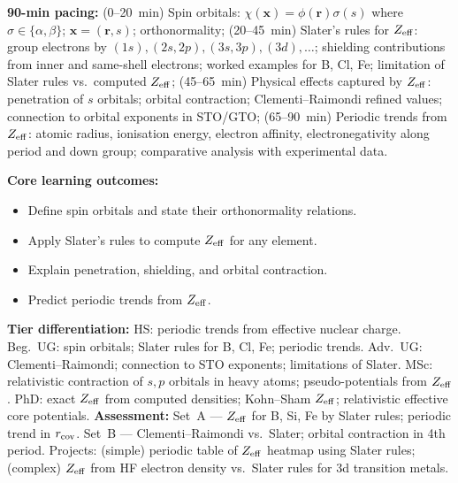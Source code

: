 \documentclass[11pt,a4paper]{article}
\begin{document}
\medskip

\begin{tcolorbox}[chembox, title={Module~III.2 / L04: Spin Orbitals, Slater Screening, and Effective Nuclear Charge}]
\textbf{90-min pacing:} (0--20~min) Spin orbitals: $\chi(\mathbf{x})=\phi(\mathbf{r})\sigma(s)$ where $\sigma\in\{\alpha,\beta\}$; $\mathbf{x}=(\mathbf{r},s)$; orthonormality; (20--45~min) Slater's rules for $Z_{\rm eff}$: group electrons by $(1s), (2s,2p), (3s,3p), (3d), \ldots$; shielding contributions from inner and same-shell electrons; worked examples for B, Cl, Fe; limitation of Slater rules vs.\ computed $Z_{\rm eff}$; (45--65~min) Physical effects captured by $Z_{\rm eff}$: penetration of $s$ orbitals; orbital contraction; Clementi--Raimondi refined values; connection to orbital exponents in STO/GTO; (65--90~min) Periodic trends from $Z_{\rm eff}$: atomic radius, ionisation energy, electron affinity, electronegativity along period and down group; comparative analysis with experimental data.

\medskip\textbf{Core learning outcomes:}
\begin{itemize}[leftmargin=1.4em,topsep=2pt,itemsep=1pt]
  \item Define spin orbitals and state their orthonormality relations.
  \item Apply Slater's rules to compute $Z_{\rm eff}$ for any element.
  \item Explain penetration, shielding, and orbital contraction.
  \item Predict periodic trends from $Z_{\rm eff}$.
\end{itemize}
\medskip\textbf{Tier differentiation:}
HS: periodic trends from effective nuclear charge.
Beg.\ UG: spin orbitals; Slater rules for B, Cl, Fe; periodic trends.
Adv.\ UG: Clementi--Raimondi; connection to STO exponents; limitations of Slater.
MSc: relativistic contraction of $s,p$ orbitals in heavy atoms; pseudo-potentials from $Z_{\rm eff}$.
PhD: exact $Z_{\rm eff}$ from computed densities; Kohn--Sham $Z_{\rm eff}$; relativistic effective core potentials.
\medskip\textbf{Assessment:}
Set~A --- $Z_{\rm eff}$ for B, Si, Fe by Slater rules; periodic trend in $r_{\rm cov}$.
Set~B --- Clementi--Raimondi vs.\ Slater; orbital contraction in 4th period.
Projects: (simple) periodic table of $Z_{\rm eff}$ heatmap using Slater rules; (complex) $Z_{\rm eff}$ from HF electron density vs.\ Slater rules for 3d transition metals.
\end{tcolorbox}

\medskip
\end{document}
